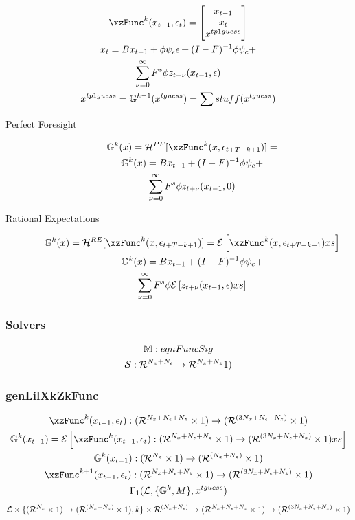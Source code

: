 \documentclass[tikz]{beamer}
\begin{document}
\begin{frame}
  \begin{gather}
  \xzFunc^k(x_{t-1},\epsilon_t)=
  \begin{bmatrix}
    x_{t-1}\\ x_t\\ \xtpguss
  \end{bmatrix}\\
x_t= \sumLinPart +\\ \sumZPart\\
\xtpguss=\XZFunc^{k-1}(\xguss) = \sum stuff(\xguss)
  \end{gather}
\end{frame}
\begin{frame}
  
 \begin{description}
\item[Perfect Foresight]
\begin{gather}
\XZFunc^{k}(x)=     \mathcal{H}^{PF}[\xzFunc^{k}(x,\epsilon_{t+T-k+1})]=\\
\XZFunc^{k}(x)=\EsumLinPart + \\  \EsumZPartZero
\end{gather}

 \item[Rational Expectations] 
 \begin{gather}
 \XZFunc^{k}(x)=     \mathcal{H}^{RE}[\xzFunc^{k}(x,\epsilon_{t+T-k+1})]=
 \expct{\xzFunc^{k}(x,\epsilon_{t+T-k+1})}\\
 \XZFunc^{k}(x)=\EsumLinPart +\\ \EsumZPartEpsilon
 \end{gather}

  \end{description}


\end{frame}



\begin{frame}
\frametitle{Solvers}
  \begin{gather}
\mathbb{M}:eqnFuncSig\\
    {\mathcal{S}} : { {{\mathcal{R}^{{N_x}+{N_\epsilon}}}\rightarrow{\mathcal{R}^{{N_x}+{N_z}}}}{1}) }
  \end{gather}
\end{frame}



\begin{frame}
\frametitle{genLilXkZkFunc}
\label{sec:genlilxkzkfunc}
\begin{gather}
\xzFunc^k(x_{t-1},\epsilon_t):\lilXFuncSig\\
\XZFunc^k(x_{t-1})=\expct{ \xzFunc^k(x_{t-1},\epsilon_t):\lilXFuncSig}\\
\XZFunc^k(x_{t-1}):\bigXFuncSig\\
\xzFunc^{k+1}(x_{t-1},\epsilon_t):\lilXFuncSig\\
  \Gamma_1(\linMod,\{\XZFunc^k,\numTerms\},\xguss)
\end{gather}
{\small
\begin{gather*}
{\mathcal{L}} \times \{  {({\mathcal{R}^{{N_x}}}\times 1)\rightarrow ({\mathcal{R}^{({{N_x}+{N_z}})}}\times 1)}, k \} \times {\mathcal{R}^{({N_x}+{N_\epsilon})}} \rightarrow
{({\mathcal{R}^{{N_x}+{N_\epsilon}+{N_z}}}\times 1)\rightarrow ({\mathcal{R}^{({3{N_x}+{N_\epsilon}+{N_z}})}}\times 1)}
\end{gather*}
}
\end{frame}
\end{document}
